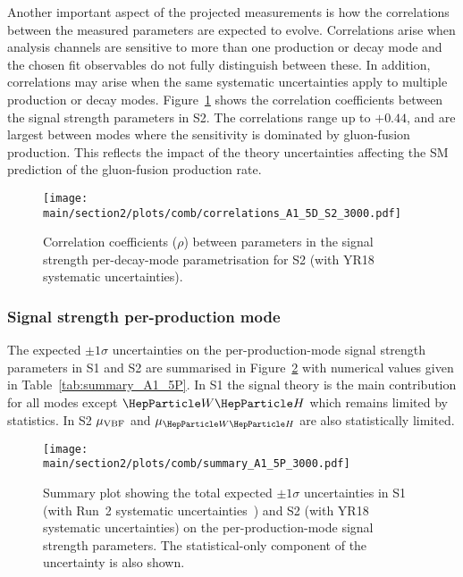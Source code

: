 Another important aspect of the projected measurements is how the correlations between the measured parameters are expected to evolve. Correlations arise when analysis channels are sensitive to more than one production or decay mode and the chosen fit observables do not fully distinguish between these. In addition, correlations may arise when the same systematic uncertainties apply to multiple production or decay modes. Figure~\ref{fig:corr_A1_5D} shows the correlation coefficients between the signal strength parameters in S2. The correlations range up to $+0.44$, and are largest between modes where the sensitivity is dominated by gluon-fusion production. This reflects the impact of the theory uncertainties affecting the SM prediction of the gluon-fusion production rate.

\begin{figure}[hbtp]
\centering
\texttt{[image: \\main/section2/plots/comb/correlations\_A1\_5D\_S2\_3000.pdf]}%
\caption{Correlation coefficients ($\rho$) between parameters in the signal strength per-decay-mode parametrisation for S2 (with YR18 systematic uncertainties).}
\label{fig:corr_A1_5D}
\end{figure}

\subsubsection{Signal strength per-production mode}
The expected $\pm 1\sigma$ uncertainties on the per-production-mode signal strength parameters in S1 and S2 are summarised in Figure~\ref{fig:summary_A1_5P} with numerical values given in Table~\ref{tab:summary_A1_5P}. In S1 the signal theory is the main contribution for all modes except $\wh$ which remains limited by statistics. In S2 $\mu_{\mathrm{VBF}}$ and $\mu_{\wh}$ are also statistically limited.


\begin{figure}[hbtp]
\centering
\texttt{[image: \\main/section2/plots/comb/summary\_A1\_5P\_3000.pdf]}%
\caption{Summary plot showing the total expected $\pm 1\sigma$ uncertainties in S1 (with Run~2 systematic uncertainties~\cite{Sirunyan:2018koj}) and S2 (with YR18 systematic uncertainties) on the per-production-mode signal strength parameters. The statistical-only component of the uncertainty is also shown.}
\label{fig:summary_A1_5P}
\end{figure}


